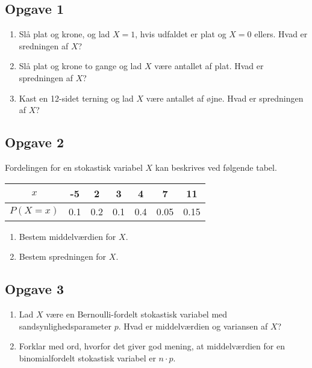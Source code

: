 \subsection*{Opgave 1}
\begin{enumerate}[label=\roman*)]
\item Slå plat og krone, og lad $X=1$, hvis udfaldet er plat og $X=0$ ellers. Hvad er sredningen af $X$?
\item Slå plat og krone to gange og lad $X$ være antallet af plat. Hvad er spredningen af $X$?
\item Kast en 12-sidet terning og lad $X$ være antallet af øjne. Hvad er spredningen af $X$?

\end{enumerate}

\subsection*{Opgave 2}

Fordelingen for en stokastisk variabel $X$ kan beskrives ved følgende tabel.

\begin{center}
	\begin{tabular}{c|c|c|c|c|c|c}
		$x$ & -5 & 2 & 3 & 4 & 7 & 11 \\
		\hline
		$P(X = x)$ & 0.1 & 0.2 & 0.1 & 0.4 & 0.05 & 0.15
	\end{tabular}
\end{center}

\begin{enumerate}[label=\roman*)]
	\item Bestem middelværdien for $X$.
	\item Bestem spredningen for $X$.
\end{enumerate}

\subsection*{Opgave 3}
\begin{enumerate}[label=\roman*)]
\item Lad $X$ være en Bernoulli-fordelt stokastisk variabel med sandsynlighedsparameter $p$. Hvad er middelværdien og variansen af $X$?
\item Forklar med ord, hvorfor det giver god mening, at middelværdien for en binomialfordelt stokastisk variabel er $n\cdot p$. 
\end{enumerate}

